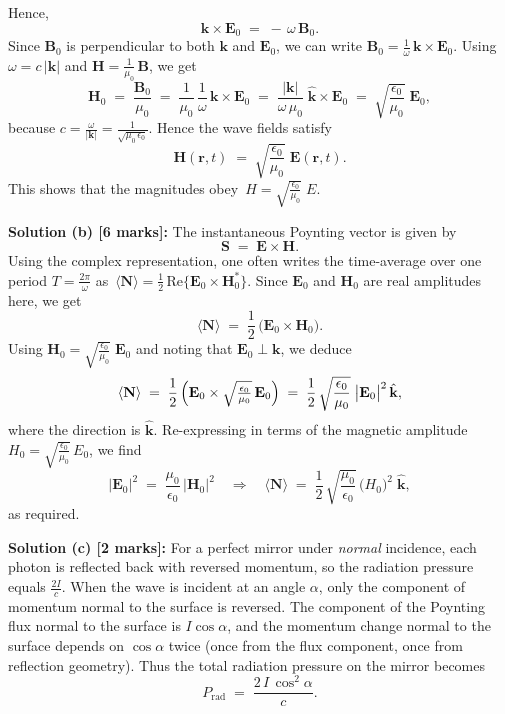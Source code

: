 \documentclass{article}
\begin{document}
Hence, 
\[
\mathbf{k}\times \mathbf{E}_0 
\;=\;
-\,\omega\,\mathbf{B}_0.
\]
Since \(\mathbf{B}_0\) is perpendicular to both \(\mathbf{k}\) and \(\mathbf{E}_0\), we can write
\(\mathbf{B}_0 = \frac{1}{\omega}\,\mathbf{k} \times \mathbf{E}_0\). 
Using \(\omega = c\,|\mathbf{k}|\) and \(\mathbf{H} = \tfrac{1}{\mu_0}\,\mathbf{B}\), we get
\[
\mathbf{H}_0 
\;=\; \frac{\mathbf{B}_0}{\mu_0}
\;=\; \frac{1}{\mu_0}\,\frac{1}{\omega}\,\mathbf{k}\times \mathbf{E}_0
\;=\;
\frac{|\mathbf{k}|}{\omega \,\mu_0}\;\hat{\mathbf{k}}\times \mathbf{E}_0 
\;=\;
\sqrt{\frac{\epsilon_0}{\mu_0}}\;\mathbf{E}_0,
\]
because \(c = \frac{\omega}{|\mathbf{k}|} = \frac{1}{\sqrt{\mu_0\,\epsilon_0}}\). 
Hence the wave fields satisfy
\[
\mathbf{H}(\mathbf{r}, t) 
\;=\;
\sqrt{\frac{\epsilon_0}{\mu_0}}\;\mathbf{E}(\mathbf{r}, t).
\]
This shows that the magnitudes obey \(\,H = \sqrt{\tfrac{\epsilon_0}{\mu_0}}\;E.\)

\bigskip

\textbf{Solution (b) [6 marks]:}
The instantaneous Poynting vector is given by
\[
\mathbf{S} \;=\; \mathbf{E}\times \mathbf{H}.
\]
Using the complex representation, one often writes the time-average over one period \(T = \frac{2\pi}{\omega}\) as 
\(\,\langle \mathbf{N}\rangle = \tfrac{1}{2}\,\mathrm{Re}\{\mathbf{E}_0\times \mathbf{H}_0^*\}\). 
Since \(\mathbf{E}_0\) and \(\mathbf{H}_0\) are real amplitudes here, we get 
\[
\langle \mathbf{N}\rangle 
\;=\; 
\frac12\,\bigl(\mathbf{E}_0\times \mathbf{H}_0\bigr).
\]
Using \(\mathbf{H}_0 = \sqrt{\tfrac{\epsilon_0}{\mu_0}}\;\mathbf{E}_0\) and noting that \(\mathbf{E}_0\perp \mathbf{k}\), we deduce
\[
\langle \mathbf{N}\rangle
\;=\;
\frac12\,
\Bigl(
\mathbf{E}_0 \times 
\sqrt{\tfrac{\epsilon_0}{\mu_0}}\,\mathbf{E}_0
\Bigr)
\;=\; 
\frac12\,\sqrt{\frac{\epsilon_0}{\mu_0}}\;\bigl|\mathbf{E}_0\bigr|^2\,\hat{\mathbf{k}},
\]
where the direction is \(\hat{\mathbf{k}}\). Re-expressing in terms of the magnetic amplitude \(H_0 = \sqrt{\tfrac{\epsilon_0}{\mu_0}}\,E_0\), we find
\[
\bigl|\mathbf{E}_0\bigr|^2 
\;=\; 
\frac{\mu_0}{\epsilon_0}\,
\bigl|\mathbf{H}_0\bigr|^2
\quad\Longrightarrow\quad
\langle \mathbf{N}\rangle 
\;=\; 
\frac12\,\sqrt{\frac{\mu_0}{\epsilon_0}}\,
\bigl(H_0\bigr)^2\;\hat{\mathbf{k}},
\]
as required.

\bigskip

\textbf{Solution (c) [2 marks]:}
For a perfect mirror under \emph{normal} incidence, each photon is reflected back with reversed momentum, so the radiation pressure equals \(\tfrac{2I}{c}\). When the wave is incident at an angle \(\alpha\), only the component of momentum normal to the surface is reversed. The component of the Poynting flux normal to the surface is \(I\cos\alpha\), and the momentum change normal to the surface depends on \(\cos\alpha\) twice (once from the flux component, once from reflection geometry). Thus the total radiation pressure on the mirror becomes
\[
P_{\text{rad}} 
\;=\; 
\frac{2\,I\,\cos^2\alpha}{c}.
\]
\end{document}
